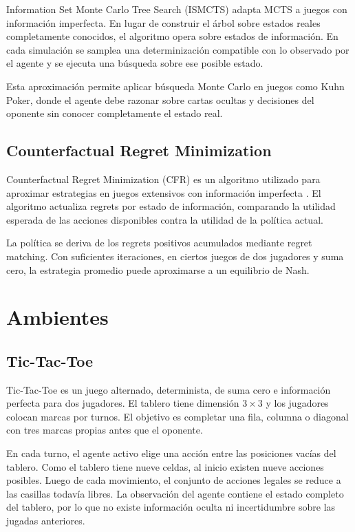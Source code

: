 \documentclass[letterpaper,12pt]{article}
\begin{document}
Information Set Monte Carlo Tree Search (ISMCTS) adapta MCTS a juegos con información imperfecta. En lugar de construir el árbol sobre estados reales completamente conocidos, el algoritmo opera sobre estados de información. En cada simulación se samplea una determinización compatible con lo observado por el agente y se ejecuta una búsqueda sobre ese posible estado.

Esta aproximación permite aplicar búsqueda Monte Carlo en juegos como Kuhn Poker, donde el agente debe razonar sobre cartas ocultas y decisiones del oponente sin conocer completamente el estado real.

\subsection{Counterfactual Regret Minimization}

Counterfactual Regret Minimization (CFR) es un algoritmo utilizado para aproximar estrategias en juegos extensivos con información imperfecta \citep{lanctot2009}. El algoritmo actualiza regrets por estado de información, comparando la utilidad esperada de las acciones disponibles contra la utilidad de la política actual.

La política se deriva de los regrets positivos acumulados mediante regret matching. Con suficientes iteraciones, en ciertos juegos de dos jugadores y suma cero, la estrategia promedio puede aproximarse a un equilibrio de Nash.

\clearpage
\section{Ambientes}

\subsection{Tic-Tac-Toe}

Tic-Tac-Toe es un juego alternado, determinista, de suma cero e información perfecta para dos jugadores. El tablero tiene dimensión $3 \times 3$ y los jugadores colocan marcas por turnos. El objetivo es completar una fila, columna o diagonal con tres marcas propias antes que el oponente.

En cada turno, el agente activo elige una acción entre las posiciones vacías del tablero. Como el tablero tiene nueve celdas, al inicio existen nueve acciones posibles. Luego de cada movimiento, el conjunto de acciones legales se reduce a las casillas todavía libres. La observación del agente contiene el estado completo del tablero, por lo que no existe información oculta ni incertidumbre sobre las jugadas anteriores.
\end{document}

